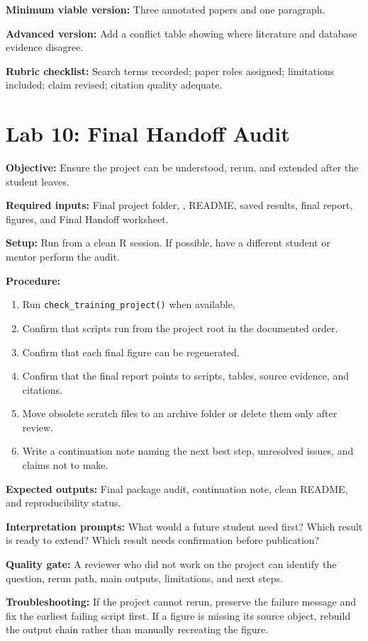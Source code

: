 \textbf{Minimum viable version:} Three annotated papers and one paragraph.

\textbf{Advanced version:} Add a conflict table showing where literature and database evidence disagree.

\textbf{Rubric checklist:} Search terms recorded; paper roles assigned; limitations included; claim revised; citation quality adequate.

\section{Lab 10: Final Handoff Audit}
\textbf{Objective:} Ensure the project can be understood, rerun, and extended after the student leaves.

\textbf{Required inputs:} Final project folder, , README, saved results, final report, figures, and Final Handoff worksheet.

\textbf{Setup:} Run from a clean R session. If possible, have a different student or mentor perform the audit.

\textbf{Procedure:}
\begin{enumerate}
  \item Run \texttt{check\_training\_project()} when available.
  \item Confirm that scripts run from the project root in the documented order.
  \item Confirm that each final figure can be regenerated.
  \item Confirm that the final report points to scripts, tables, source evidence, and citations.
  \item Move obsolete scratch files to an archive folder or delete them only after review.
  \item Write a continuation note naming the next best step, unresolved issues, and claims not to make.
\end{enumerate}

\textbf{Expected outputs:} Final package audit, continuation note, clean README, and reproducibility status.

\textbf{Interpretation prompts:} What would a future student need first? Which result is ready to extend? Which result needs confirmation before publication?

\textbf{Quality gate:} A reviewer who did not work on the project can identify the question, rerun path, main outputs, limitations, and next steps.

\textbf{Troubleshooting:} If the project cannot rerun, preserve the failure message and fix the earliest failing script first. If a figure is missing its source object, rebuild the output chain rather than manually recreating the figure.


